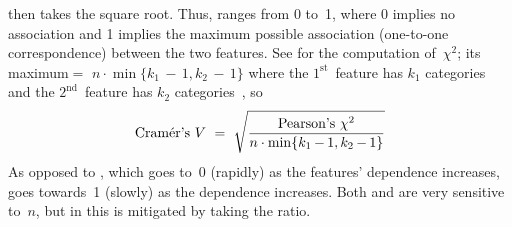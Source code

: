 \begin{Description}
then takes the square root.  Thus, \NameStatV{} ranges from 0 to~1,
where 0 implies no association and 1 implies the maximum possible association (one-to-one
correspondence) between the two features.  See \emph{\NameStatChi} for the computation of~$\chi^2$;
its maximum${} = {}$%
$n\cdot\min\{k_1\,{-}\,1, k_2\,{-}\,1\}$ where the $1^{\textrm{st}}$~feature
has $k_1$ categories and the $2^{\textrm{nd}}$~feature has $k_2$ categories~\cite{AcockStavig1979:CramersV},
so
\begin{equation*}
\textrm{Cram\'er's~$V$} \,\,=\,\, \sqrt{\frac{\textrm{Pearson's~$\chi^2$}}{n\cdot\min\{k_1\,{-}\,1, k_2\,{-}\,1\}}}
\end{equation*}
As opposed to \NameStatPChi, which goes to~0 (rapidly) as the features' dependence increases,
\NameStatV{} goes towards~1 (slowly) as the dependence increases.  Both \NameStatChi{} and
\NameStatPChi{} are very sensitive to~$n$, but in \NameStatV{} this is mitigated by taking the
ratio.
\end{Description}


